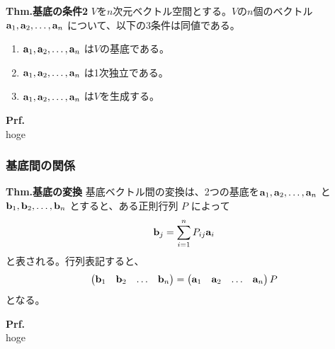 \documentclass[a4paper,11pt]{jsarticle}
\numberwithin{equation}{section}
\begin{document}
\begin{itembox}[l]{\textbf{Thm.基底の条件2}}
  $V$を$n$次元ベクトル空間とする。$V$の$n$個のベクトル$\vb{a}_1, \vb{a}_2, \dots, \vb{a}_n$ について、以下の3条件は同値である。
  \begin{enumerate}
    \item $\vb{a}_1, \vb{a}_2, \dots, \vb{a}_n$ は$V$の基底である。
    \item $\vb{a}_1, \vb{a}_2, \dots, \vb{a}_n$ は1次独立である。
    \item $\vb{a}_1, \vb{a}_2, \dots, \vb{a}_n$ は$V$を生成する。
  \end{enumerate}
\end{itembox}
\textbf{Prf.}\\
hoge\hfill\qedsymbol\\


\subsubsection{基底間の関係}
\begin{itembox}[l]{\textbf{Thm.基底の変換}}
  基底ベクトル間の変換は、2つの基底を$\vb{a}_1, \vb{a}_2, \dots, \vb{a}_n$ と $\vb{b}_1, \vb{b}_2, \dots, \vb{b}_n$ とすると、ある正則行列 $P$ によって 
  \begin{align}
    \vb{b}_j = \sum_{i=1}^{n} P_{ij} \vb{a}_i
  \end{align}
  と表される。行列表記すると、
  \begin{align}
    \begin{pmatrix}
      \vb{b}_1 & \vb{b}_2 & \dots & \vb{b}_n
    \end{pmatrix}
    =
    \begin{pmatrix}
      \vb{a}_1 & \vb{a}_2 & \dots & \vb{a}_n
    \end{pmatrix}
    P
  \end{align}
  となる。
\end{itembox}
\textbf{Prf.}\\
hoge\hfill\qedsymbol\\
\end{document}
